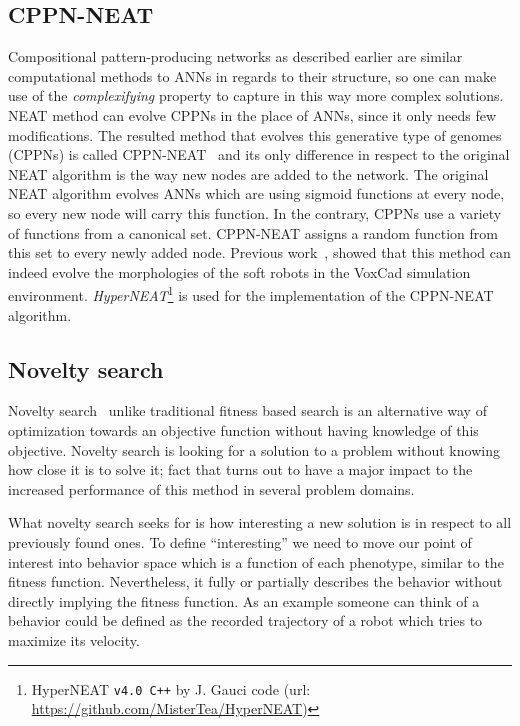 \documentclass{sig-alternate}
\begin{document}
\subsection{CPPN-NEAT}

Compositional pattern-producing networks as described earlier are similar computational methods to ANNs in regards to their structure, so one can make use of the \emph{complexifying} property to capture in this way more complex solutions. NEAT method can evolve CPPNs in the place of ANNs, since it only needs few modifications. The resulted method that evolves this generative type of genomes (CPPNs) is called CPPN-NEAT~\cite{stanley2007compositional} and its only difference in respect to the original NEAT algorithm is the way new nodes are added to the network. The original NEAT algorithm evolves ANNs which are using sigmoid functions at every node, so every new node will carry this function. In the contrary, CPPNs use a variety of functions from a canonical set. CPPN-NEAT assigns a random function from this set to every newly added node. Previous work~\cite{cheney2013unshackling}, showed that this method can indeed evolve the morphologies of the soft robots in the VoxCad simulation environment. \textit{HyperNEAT}\footnote{HyperNEAT \texttt{v4.0 C++}  by J. Gauci code (url: \url{https://github.com/MisterTea/HyperNEAT})} is used for the implementation of the CPPN-NEAT algorithm.


\subsection{Novelty search}

Novelty search~\cite{lehman2008exploiting,lehman2011abandoning,lehman2010revising, risi2009novelty} unlike traditional fitness based search is an alternative way of optimization towards an objective function without having knowledge of this objective. Novelty search is looking for a solution to a problem without knowing how close it is to solve it; fact that turns out to have a major impact to the increased performance of this method in several problem domains. 

What novelty search seeks for is how interesting a new solution is in respect to all previously found ones. To define ``interesting'' we need to move our point of interest into behavior space which is a function of each phenotype, similar to the fitness function. Nevertheless, it fully or partially describes the behavior without directly implying the fitness function. As an example someone can think of a behavior could be defined as the recorded trajectory of a robot which tries to maximize its velocity. 
\end{document}
